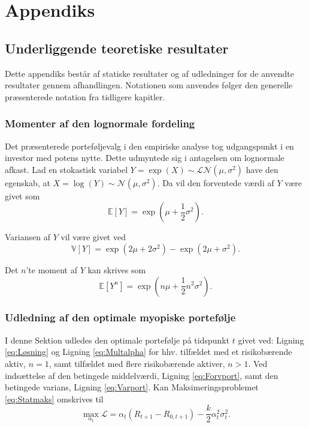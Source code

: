 \documentclass[
  a4paper,
  oneside]{memoir}
\begin{document}
\hypertarget{appendix-appendiks}{%
\appendix}


\part{Appendiks}

\hypertarget{underligteo}{%
\chapter{Underliggende teoretiske resultater}\label{underligteo}}

Dette appendiks består af statiske resultater og af udledninger for de anvendte resultater gennem afhandlingen. Notationen som anvendes følger den generelle præsenterede notation fra tidligere kapitler.

\hypertarget{momlognorm}{%
\section{Momenter af den lognormale fordeling}\label{momlognorm}}

Det præsenterede porteføljevalg i den empiriske analyse tog udgangspunkt i en investor med potens nytte. Dette udmyntede sig i antagelsen om lognormale afkast. Lad en stokastisk variabel \(Y=\exp(X)\sim \mathcal{LN}(\mu,\sigma^2)\) have den egenskab, at \(X=\log(Y)\sim\mathcal{N}(\mu,\sigma^2)\). Da vil den forventede værdi af \(Y\) være givet som
\[\mathbb{E}[Y]=\exp\left(\mu+\frac{1}{2}\sigma^2\right).\]

Variansen af \(Y\) vil være givet ved
\[\mathbb{V}\left[Y\right]=\exp\left(2\mu+2\sigma^2\right)-\exp\left(2\mu+\sigma^2\right).\]

Det \(n\)'te moment af \(Y\) kan skrives som
\[\mathbb{E}\left[Y^n\right]=\exp\left(n\mu + \frac{1}{2}n^2\sigma^2\right).\]

\hypertarget{udlmyo}{%
\section{Udledning af den optimale myopiske portefølje}\label{udlmyo}}

I denne Sektion udledes den optimale portefølje på tidspunkt \(t\) givet ved: Ligning \eqref{eq:Løsning} og Ligning \eqref{eq:Multalpha} for hhv. tilfældet med et risikobærende aktiv, \(n=1\), samt tilfældet med flere risikobærende aktiver, \(n>1\). Ved indsættelse af den betingede middelværdi, Ligning \eqref{eq:Forvport}, samt den betingede varians, Ligning \eqref{eq:Varport}. Kan Maksimeringsproblemet \eqref{eq:Statmaks} omskrives til
\[\max_{\alpha_t} \mathcal{L}=\alpha_t\left(R_{t+1} - R_{0,t+1}\right)-\frac{k}{2}\alpha_t^2\sigma_t^2.\]
\end{document}
